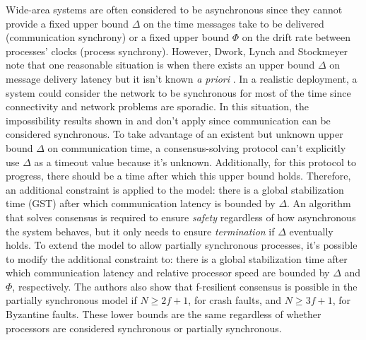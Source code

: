 Wide-area systems are often considered to be asynchronous since they cannot provide a fixed upper bound $\Delta$ on the time messages take to be delivered (communication synchrony) or a fixed upper bound $\Phi$ on the drift rate between processes' clocks (process synchrony). However, Dwork, Lynch and Stockmeyer note that one reasonable situation is when there exists an upper bound $\Delta$ on message delivery latency but it isn't known \textit{a priori} \cite{Dwork1988}. In a realistic deployment, a system could consider the network to be synchronous for most of the time since connectivity and network problems are sporadic. In this situation, the impossibility results shown in \cite{Fischer1985} and \cite{Dolev1983} don't apply since communication can be considered synchronous. To take advantage of an existent but unknown upper bound $\Delta$ on communication time, a consensus-solving protocol can't explicitly use $\Delta$ as a timeout value because it's unknown. Additionally, for this protocol to progress, there should be a time after which this upper bound holds. Therefore, an additional constraint is applied to the model: there is a global stabilization time (GST) after which communication latency is bounded by $\Delta$. An algorithm that solves consensus is required to ensure \textit{safety} regardless of how asynchronous the system behaves, but it only needs to ensure \textit{termination} if $\Delta$ eventually holds. To extend the model to allow partially synchronous processes, it's possible to modify the additional constraint to: there is a global stabilization time after which communication latency and relative processor speed are bounded by $\Delta$ and $\Phi$, respectively. The authors also show that f-resilient consensus is possible in the partially synchronous model if $N \geq 2f+1$, for crash faults, and $N \geq 3f+1$, for Byzantine faults. These lower bounds are the same regardless of whether processors are considered synchronous or partially synchronous.\par

